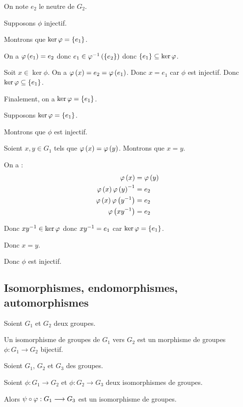 \begin{dem}
On note \(e_2\) le neutre de \(G_2\).

\impdir

Supposons \(\phi\) injectif.

Montrons que \(\ker\varphi=\left\lbrace e_1\right\rbrace\).

\increc On a \(\varphi\left(e_1\right)=e_2\) donc \(e_1\in\varphi^{-1}\left(\left\lbrace e_2\right\rbrace\right)\) donc \(\left\lbrace e_1\right\rbrace\subseteq\ker\varphi\).

\incdir Soit \(x\in\ker\phi\). On a \(\varphi\left(x\right)=e_2=\varphi\left(e_1\right)\). Donc \(x=e_1\) car \(\phi\) est injectif. Donc \(\ker\varphi\subseteq\left\lbrace e_1\right\rbrace\).

Finalement, on a \(\ker\varphi=\left\lbrace e_1\right\rbrace\).

\imprec

Supposons \(\ker\varphi=\left\lbrace e_1\right\rbrace\).

Montrons que \(\phi\) est injectif.

Soient \(x,y\in G_1\) tels que \(\varphi\left(x\right)=\varphi\left(y\right)\). Montrons que \(x=y\).

On a : \[\begin{aligned}
\varphi\left(x\right)&=\varphi\left(y\right) \\
\varphi\left(x\right)\varphi\left(y\right)^{-1}&=e_2 \\
\varphi\left(x\right)\varphi\left(y^{-1}\right)&=e_2 \\
\varphi\left(xy^{-1}\right)&=e_2
\end{aligned}\]

Donc \(xy^{-1}\in\ker\varphi\) donc \(xy^{-1}=e_1\) car \(\ker\varphi=\left\lbrace e_1\right\rbrace\).

Donc \(x=y\).

Donc \(\phi\) est injectif.
\end{dem}

\subsection{Isomorphismes, endomorphismes, automorphismes}

\begin{defi}[Isomorphisme]
Soient \(G_1\) et \(G_2\) deux groupes.

Un isomorphisme de groupes de \(G_1\) vers \(G_2\) est un morphisme de groupes \(\phi:G_1\to G_2\) bijectif.
\end{defi}

\begin{theo}
Soient \(G_1\), \(G_2\) et \(G_3\) des groupes.

Soient \(\phi:G_1\to G_2\) et \(\phi:G_2\to G_3\) deux isomorphismes de groupes.

Alors \(\psi\circ\varphi:G_1\longrightarrow G_3\) est un isomorphisme de groupes.
\end{theo}

